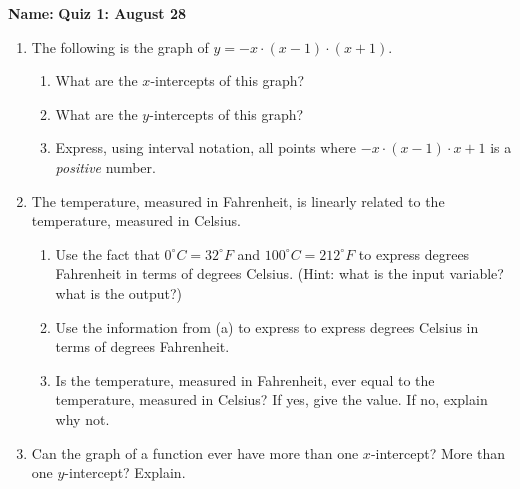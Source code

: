 \documentclass{article}
\begin{document}
\noindent \textbf{Name:}\underline{\hspace{2in}} \hfill \textbf{Quiz 1: August 28}

\begin{enumerate}
\item The following is the graph of $y = - x \cdot (x-1) \cdot (x+1)$.
  \begin{multicols}{2}
  \begin{enumerate}
  \item What are the $x$-intercepts of this graph?
    \vspace{0.5in}
  \item What are the $y$-intercepts of this graph?
    \vspace{0.5in}
  \item Express, using interval notation, all points where $-x \cdot (x-1) \cdot x+1$ is a \emph{positive} number.
  \end{enumerate}
\end{multicols}
\vspace{0.5in}
\item The temperature, measured in Fahrenheit, is linearly related to the temperature, measured in Celsius.
  \begin{enumerate}
  \item   Use the fact that $0^\circ C = 32^\circ F$ and $100^\circ C = 212^\circ F$ to express degrees Fahrenheit in terms of degrees Celsius. (Hint: what is the input variable? what is the output?)
    \vspace{1in}
  \item Use the information from (a) to express to express degrees Celsius in terms of degrees Fahrenheit.
    \vspace{1in}
  \item Is the temperature, measured in Fahrenheit, ever equal to the temperature, measured in Celsius? If yes, give the value. If no, explain why not.
  \end{enumerate}
  \vspace{1in}
\item Can the graph of a function ever have more than one $x$-intercept? More than one $y$-intercept? Explain.

\end{enumerate}
\end{document}
